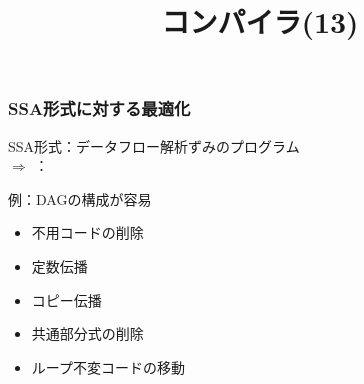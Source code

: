 \documentclass[dvipdfmx]{beamer}
\title{コンパイラ(13)}
\date{\lecturedate}
\begin{document}
\frame{\titlepage}

\begin{frame}
  \frametitle{SSA形式に対する最適化}
  SSA形式：データフロー解析ずみのプログラム\\[2zw]

  $\Rightarrow$
  ：

  例：DAGの構成が容易

  \vspace*{1zw}

  \begin{itemize}
    \item 不用コードの削除
    \item 定数伝播
    \item コピー伝播
    \item 共通部分式の削除
    \item ループ不変コードの移動
  \end{itemize}
\end{frame}
\end{document}
